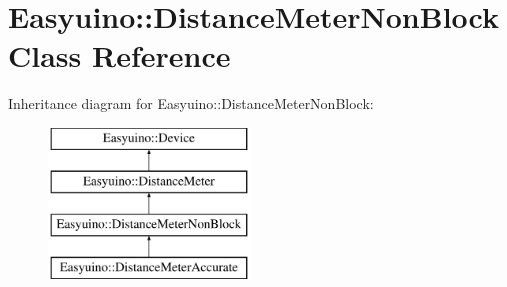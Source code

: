 \hypertarget{class_easyuino_1_1_distance_meter_non_block}{}\section{Easyuino\+:\+:Distance\+Meter\+Non\+Block Class Reference}
\label{class_easyuino_1_1_distance_meter_non_block}
Inheritance diagram for Easyuino\+:\+:Distance\+Meter\+Non\+Block\+:\begin{figure}[H]
\begin{center}
\leavevmode
\includegraphics[height=4.000000cm]{class_easyuino_1_1_distance_meter_non_block}
\end{center}
\end{figure}
